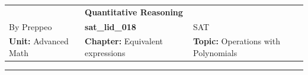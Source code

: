 \documentclass[11pt,paper=a4,answers]{exam}
\begin{document}
\begin{center}
    \centering
    \renewcommand{\arraystretch}{1.5}
    \begin{tabularx}{\textwidth}{YYY}
    & \normalsize\bf{{\Large{{Quantitative Reasoning}}}} & \\
    By Preppeo & \normalsize\bf{{sat\_lid\_018}} & SAT\\
    \normalsize{{\textbf{{Unit:}} Advanced Math}} & \normalsize{{\textbf{{Chapter:}} Equivalent expressions}} & \normalsize{{\textbf{{Topic:}} Operations with Polynomials}} \\
    \end{tabularx}
\end{center}
\par\noindent\rule{\textwidth}{1pt}
\end{document}
